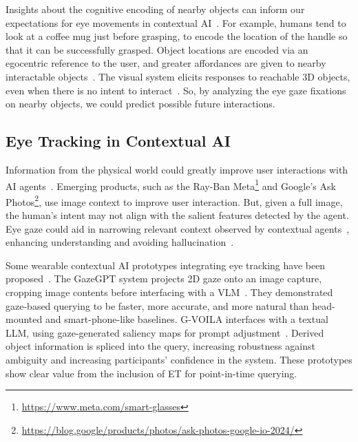 Insights about the cognitive encoding of nearby objects can inform our expectations for eye movements in contextual AI~\cite{Tatler2011}.  For example, humans tend to look at a coffee mug just before grasping, to encode the location of the handle so that it can be successfully grasped.  Object locations are encoded via an egocentric reference to the user, and greater affordances are given to nearby interactable objects~\cite{costantini_affordance_2010, Tatler2011}.  The visual system elicits responses to reachable 3D objects, even when there is no intent to interact~\cite{iachini_motor_2014, iachini_temporal_2023}.  So, by analyzing the eye gaze fixations on nearby objects, we could predict possible future interactions. 

\subsection{Eye Tracking in Contextual AI}

Information from the physical world could greatly improve user interactions with AI agents~\cite{zhang_vision_survey_2024}.  Emerging products, such as the Ray-Ban Meta\footnote{\url{https://www.meta.com/smart-glasses}} and Google's Ask Photos\footnote{\url{https://blog.google/products/photos/ask-photos-google-io-2024/}}, use image context to improve user interaction.  But, given a full image, the human's intent may not align with the salient features detected by the agent.  Eye gaze could aid in narrowing relevant context observed by contextual agents~\cite{ajanki_contextual_2010, buschel_here_2018}, enhancing understanding and avoiding hallucination~\cite{cui_holistic_2023, leng_hallucinations_2024}.  

Some wearable contextual AI prototypes integrating eye tracking have been proposed~\cite{zhang_agi_2024}.  The GazeGPT system projects 2D gaze onto an image capture, cropping image contents before interfacing with a VLM~\cite{konrad_gazegpt_2024}.  They demonstrated gaze-based querying to be faster, more accurate, and more natural than head-mounted and smart-phone-like baselines.  G-VOILA interfaces with a textual LLM, using gaze-generated saliency maps for prompt adjustment~\cite{wang_gvoila_2024}.  Derived object information is spliced into the query, increasing robustness against ambiguity and increasing participants' confidence in the system.  These prototypes show clear value from the inclusion of ET for point-in-time querying.  